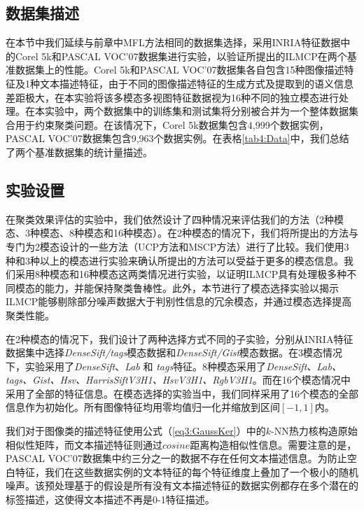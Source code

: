 \subsection{数据集描述}
在本节中我们延续与前章中MFL方法相同的数据集选择，采用INRIA特征数据\cite{guillaumin2009tagprop}中的Corel 5k和PASCAL VOC'07数据集进行实验，以验证所提出的ILMCP在两个基准数据集上的性能。Corel 5k和PASCAL VOC'07数据集各自包含15种图像描述特征及1种文本描述特征，由于不同的图像描述特征的生成方式及提取到的语义信息差距极大，在本实验将该多模态多视图特征数据视为16种不同的独立模态进行处理。在本实验中，两个数据集中的训练集和测试集将分别被合并为一个整体数据集合用于约束聚类问题。在该情况下，Corel 5k数据集包含4,999个数据实例，PASCAL VOC'07数据集包含9,963个数据实例。在表格\ref{tab4:Data}中，我们总结了两个基准数据集的统计量描述。

\subsection{实验设置}

在聚类效果评估的实验中，我们依然设计了四种情况来评估我们的方法（2种模态、3种模态、8种模态和16种模态）。在2种模态的情况下，我们将所提出的方法与专门为2模态设计的一些方法（UCP方法和MSCP方法）进行了比较。我们使用3种和3种以上的模态进行实验来确认所提出的方法可以受益于更多的模态信息。我们采用8种模态和16种模态这两类情况进行实验，以证明ILMCP具有处理极多种不同模态的能力，并能保持聚类鲁棒性。此外，本节进行了模态选择实验以揭示ILMCP能够剔除部分噪声数据大于判别性信息的冗余模态，并通过模态选择提高聚类性能。

在2种模态的情况下，我们设计了两种选择方式不同的子实验，分别从INRIA特征数据集中选择\textit{DenseSift/tags}模态数据和\textit{DenseSift/Gist}模态数据。在3模态情况下，实验采用了\textit{DenseSift}、\textit{Lab} 和 \textit{tags}特征。8种模态采用了\textit{DenseSift、Lab、tags、Gist、Hsv、HarrisSiftV3H1、HsvV3H1、RgbV3H1}。而在16个模态情况中采用了全部的特征信息。在模态选择的实验当中，我们同样采用了16个模态的全部信息作为初始化。所有图像特征均用零均值归一化并缩放到区间$[-1,1] $内。

我们对于图像类的描述特征使用公式（\ref{eq3:GaussKer}）中的$k$-NN热力核构造原始相似性矩阵，而文本描述特征则通过$cosine$距离构造相似性信息。需要注意的是，PASCAL VOC'07数据集中约三分之一的数据不存在任何文本描述信息。为防止空白特征，我们在这些数据实例的文本特征的每个特征维度上叠加了一个极小的随机噪声。该预处理基于的假设是所有没有文本描述特征的数据实例都存在多个潜在的标签描述，这使得文本描述不再是0-1特征描述。


